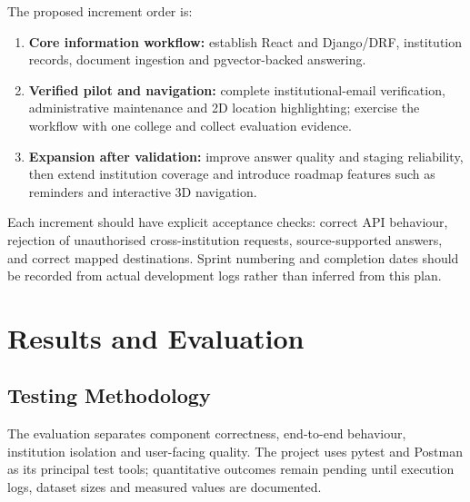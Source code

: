\documentclass{tietreport}
\begin{document}
The proposed increment order is:
\begin{enumerate}
  \item \textbf{Core information workflow:} establish React and Django/DRF,
    institution records, document ingestion and pgvector-backed answering.
  \item \textbf{Verified pilot and navigation:} complete institutional-email
    verification, administrative maintenance and 2D location highlighting;
    exercise the workflow with one college and collect evaluation evidence.
  \item \textbf{Expansion after validation:} improve answer quality and staging
    reliability, then extend institution coverage and introduce roadmap
    features such as reminders and interactive 3D navigation.
\end{enumerate}

Each increment should have explicit acceptance checks: correct API behaviour,
rejection of unauthorised cross-institution requests, source-supported answers,
and correct mapped destinations. Sprint numbering and completion dates should
be recorded from actual development logs rather than inferred from this plan.

\chapter{Results and Evaluation}
\label{chap:evaluation}

\section{Testing Methodology}

The evaluation separates component correctness, end-to-end behaviour,
institution isolation and user-facing quality. The project uses pytest and
Postman as its principal test tools; quantitative outcomes remain pending until
execution logs, dataset sizes and measured values are documented.
\end{document}
